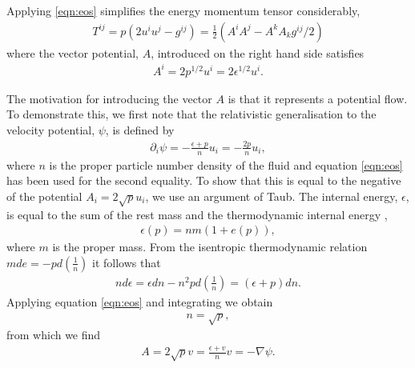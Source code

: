 \documentclass[10pt, fleqn,final,showtrims,oldfontcommands]{article} %
\newcommand{\eqal}[2]{\begin{align}#1\label{eqn:#2}\end{align}}
\newcommand{\eqnref}[1]{\ref{eqn:#1}}
\newcommand{\lr}[1]{\left( #1 \right)}
\renewcommand{\d}{\partial}
\newcommand{\del}{\nabla}
\newcommand{\half}{\tfrac{1}{2}}
\begin{document}
Applying \eqnref{eos} simplifies the energy momentum tensor considerably,
\eqal{
  T^{i j}  = p\lr{2 u^i u^j - g^{i j}} = \half \lr{ A^i A^j - A^k A_k g^{i j}/2} 
}{EMFluid}
where the vector potential, $A$, introduced on the right hand side satisfies
\eqal{
  A^i = 2p^{1/2}u^i =2 \epsilon^{1/2} u^i.
}{defnA}

The motivation for introducing the vector $A$ is that it represents a potential flow.
To demonstrate this, we first note that the relativistic generalisation to the velocity potential, $\psi$,  is defined by\cite{LandauBook}
\begin{align}
  \d_i \psi = - \frac{\epsilon+p}{n} u_i = - \frac{2 p}{n} u_i,
\end{align}
where $n$ is the proper particle number density of the fluid and equation \eqnref{eos} has been used for the second equality.
To show that this is equal to the negative of the potential $A_i = 2\sqrt p u_i$, we use an argument of Taub\cite{Taub1978}.
The internal energy, $\epsilon$, is equal to the sum of the rest mass and the thermodynamic internal energy \cite{LandauBook, Doran2003},
\begin{align}
  \epsilon(p) = nm( 1 + e(p)),
\end{align}
where $m$ is the proper mass.
From the isentropic thermodynamic relation $m de = - p d\lr{\frac{1}{n}}$
it follows that 
\begin{align}
 n d\epsilon = \epsilon dn - n^2 p d \lr{\frac{1}{n}} = \lr{\epsilon + p} dn.
\end{align}
Applying equation \eqnref{eos} and integrating we obtain
\begin{align}
n = \sqrt p,
\end{align}
from which we find
\begin{align}
A = 2\sqrt p  v = \frac{\epsilon + v}{n} v = - \del \psi.
\label{eqn:AisPotFlow}
\end{align}
\end{document}
